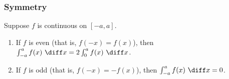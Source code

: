 \begin{frame}
\frametitle{Symmetry}
\begin{theorem}
Suppose $f$ is continuous on $[-a, a]$.
\begin{enumerate}
\item  If $f$ is even (that is, $f(-x) = f(x)$), then $\int_{-a}^a f(x) \ \diff x = 2\int_0^a f(x) \ \diff x$.
\item  If $f$ is odd (that is, $f(-x) = -f(x)$), then $\int_{-a}^a f(x) \ \diff x = 0$.
\end{enumerate}
\end{theorem}
\end{frame}
